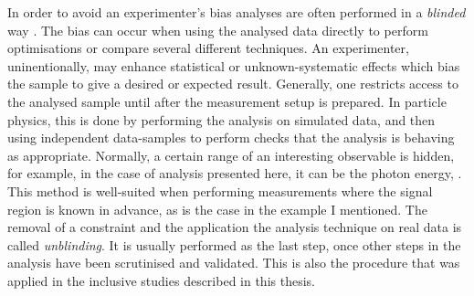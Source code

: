 In order to avoid an experimenter's bias analyses are often performed in a \textit{blinded} way \cite{Roodman:2003rw}.
The bias can occur when using the analysed data directly to perform optimisations or compare several different techniques.
An experimenter, uninentionally, may enhance statistical or unknown-systematic effects which bias the sample to give a desired or expected result.
Generally, one restricts access to the analysed sample until after the measurement setup is prepared.
In particle physics, this is done by performing the analysis on simulated data, and then using independent data-samples to perform checks that the analysis is behaving as appropriate.
Normally, a certain range of an interesting observable is hidden, for example, in the case of \BtoXsgamma analysis presented here, it can be the photon energy, \Egamma.
This method is well-suited when performing measurements where the signal region is known in advance, as is the case in the example I mentioned.
The removal of a constraint and the application the analysis technique on real data is called \textit{unblinding}.
It is usually performed as the last step, once other steps in the analysis have been scrutinised and validated.
This is also the procedure that was applied in the inclusive \BtoXsgamma studies described in this thesis.